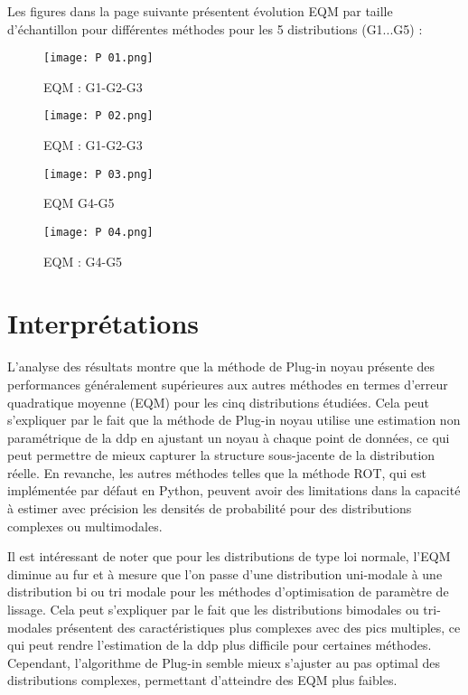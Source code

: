 Les figures dans la page suivante présentent évolution EQM par taille d'échantillon pour différentes méthodes pour les 5 distributions (G1...G5) :  
\begin{figure}[!h]
  \centering
  \texttt{[image: P 01.png]}
  \caption{EQM : G1-G2-G3}
  \label{fig:G1-G2-G3}
\end{figure}
\begin{figure}[!h]
  \centering
  \texttt{[image: P 02.png]}
  \caption{EQM : G1-G2-G3}
  \label{fig:G1-G2-G3}
\end{figure}
\begin{figure}[!h]
  \centering
  \texttt{[image: P 03.png]}
  \caption{EQM  G4-G5}
  \label{fig:G4-G5}
\end{figure}
\begin{figure}[!h]
  \centering
  \texttt{[image: P 04.png]}
  \caption{EQM : G4-G5}
  \label{fig:G1-G2-G3}
\end{figure}
\clearpage
\section{Interprétations}
L'analyse des résultats montre que la méthode de Plug-in noyau présente des performances généralement supérieures aux autres méthodes en termes d'erreur quadratique moyenne (EQM) pour les cinq distributions étudiées. Cela peut s'expliquer par le fait que la méthode de Plug-in noyau utilise une estimation non paramétrique de la ddp en ajustant un noyau à chaque point de données, ce qui peut permettre de mieux capturer la structure sous-jacente de la distribution réelle. En revanche, les autres méthodes telles que la méthode ROT, qui est implémentée par défaut en Python, peuvent avoir des limitations dans la capacité à estimer avec précision les densités de probabilité pour des distributions complexes ou multimodales.
 
Il est intéressant de noter que pour les distributions de type loi normale, l'EQM diminue au fur et à mesure que l'on passe d'une distribution uni-modale à une distribution bi ou tri modale pour les méthodes d'optimisation de paramètre de lissage. Cela peut s'expliquer par le fait que les distributions bimodales ou tri-modales présentent des caractéristiques plus complexes avec des pics multiples, ce qui peut rendre l'estimation de la ddp plus difficile pour certaines méthodes. Cependant, l'algorithme de Plug-in semble mieux s'ajuster au pas optimal des distributions complexes, permettant d'atteindre des EQM plus faibles.

